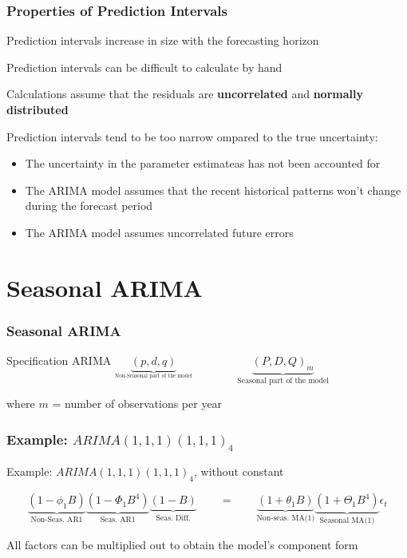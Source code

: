 \documentclass{beamer}
\newenvironment{wideenumerate}{\enumerate\addtolength{\itemsep}{10pt}}{\endenumerate}
\begin{document}
\begin{frame}
  \frametitle{Properties of Prediction Intervals}
  \begin{wideenumerate}
    \item Prediction intervals increase in size with the forecasting horizon
    \item Prediction intervals can be difficult to calculate by hand
    \item Calculations assume that the residuals are \textbf{uncorrelated} and \textbf{normally distributed}
    \item Prediction intervals tend to be too narrow ompared to the true uncertainty:
      \begin{itemize}
      \item The uncertainty in the parameter estimateas has not been accounted for
      \item The ARIMA model assumes that the recent historical patterns won't change during the forecast period
      \item The ARIMA model assumes uncorrelated future errors
      \end{itemize}
  \end{wideenumerate}
\end{frame}

\section{Seasonal ARIMA}
\begin{frame}
  \frametitle{Seasonal ARIMA}

  \begin{block}{Specification}
    ARIMA  $ \underbrace{(p, d, q)}_{_{\text{Non-Seasonal part of the model}}} \qquad \qquad \underbrace{(P, D, Q)_m}_{\text{Seasonal part of the model}}$
  \end{block}

\medskip
  
where $m$ = number of observations per year
  
\end{frame}


\begin{frame}
  \frametitle{Example: $ARIMA(1,1,1)(1,1,1)_4$}

Example: $ARIMA(1,1,1)(1,1,1)_4$, without constant

\begin{equation*}
  \underbrace{(1-\phi_1B)}_{\text{Non-Seas. AR1}} \underbrace{(1-\Phi_1B^4)}_{\text{Seas. AR1}}\underbrace{(1-B)}_{\text{Seas. Diff.}} \qquad = \qquad \underbrace{(1+\theta_1 B)}_{\text{Non-seas. MA(1)}} \underbrace{(1+\Theta_1 B^4)}_{\text{Seasonal MA(1)}}\epsilon_t
\end{equation*}

\medskip

  All factors can be multiplied out to obtain the model's component form
\end{frame}
\end{document}
